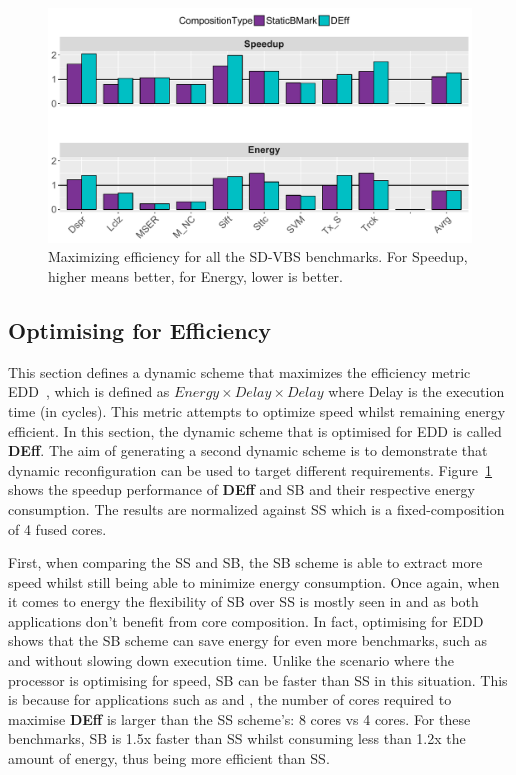 \begin{figure}[t]
    \centering
    \includegraphics[width=1\textwidth]{cases-paper/graphics/results/edd_bars3.pdf}
    \caption{Maximizing efficiency for all the SD-VBS benchmarks. For Speedup, higher means better, for Energy, lower is better.}
    \label{fig:effres}
	\vspace{1em}
\end{figure}

\subsection{Optimising for Efficiency}

This section defines a dynamic scheme that maximizes the efficiency metric EDD~\cite{lee2006linreg}, which is defined as $Energy \times Delay \times Delay$ where Delay is the execution time (in cycles).
This metric attempts to optimize speed whilst remaining energy efficient.
In this section, the dynamic scheme that is optimised for EDD is called \textbf{DEff}.
The aim of generating a second dynamic scheme is to demonstrate that dynamic reconfiguration can be used to target different requirements.
Figure~\ref{fig:effres} shows the speedup performance of \textbf{DEff} and SB and their respective energy consumption.
The results are normalized against SS which is a fixed-composition of 4 fused cores.


First, when comparing the SS and SB, the SB scheme is able to extract more speed whilst still being able to minimize energy consumption.
Once again, when it comes to energy the flexibility of SB over SS is mostly seen in  and  as both applications don't benefit from core composition.
In fact, optimising for EDD shows that the SB scheme can save energy for even more benchmarks, such as  and  without slowing down execution time.
Unlike the scenario where the processor is optimising for speed, SB can be faster than SS in this situation.
This is because for applications such as  and , the number of cores required to maximise \textbf{DEff} is larger than the SS scheme's: 8 cores vs 4 cores.
For these benchmarks, SB is 1.5x faster than SS whilst consuming less than 1.2x the amount of energy, thus being more efficient than SS.

